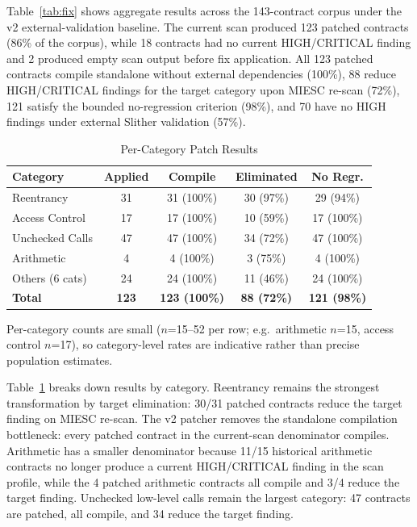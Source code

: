\documentclass[conference]{IEEEtran}
\begin{document}
Table~\ref{tab:fix} shows aggregate results across the 143-contract corpus under the v2 external-validation baseline. The current scan produced 123 patched contracts (86\% of the corpus), while 18 contracts had no current HIGH/CRITICAL finding and 2 produced empty scan output before fix application. All 123 patched contracts compile standalone without external dependencies (100\%), 88 reduce HIGH/CRITICAL findings for the target category upon MIESC re-scan (72\%), 121 satisfy the bounded no-regression criterion (98\%), and 70 have no HIGH findings under external Slither validation (57\%).

\begin{table}[htbp]
\caption{Per-Category Patch Results}
\label{tab:fix-category}
\centering
\begin{tabular}{@{}lcccc@{}}
\toprule
\textbf{Category} & \textbf{Applied} & \textbf{Compile} & \textbf{Eliminated} & \textbf{No Regr.} \\
\midrule
Reentrancy & 31 & 31 (100\%) & 30 (97\%) & 29 (94\%) \\
Access Control & 17 & 17 (100\%) & 10 (59\%) & 17 (100\%) \\
Unchecked Calls & 47 & 47 (100\%) & 34 (72\%) & 47 (100\%) \\
Arithmetic & 4 & 4 (100\%) & 3 (75\%) & 4 (100\%) \\
Others (6 cats) & 24 & 24 (100\%) & 11 (46\%) & 24 (100\%) \\
\midrule
\textbf{Total} & \textbf{123} & \textbf{123 (100\%)} & \textbf{88 (72\%)} & \textbf{121 (98\%)} \\
\bottomrule
\end{tabular}

\vspace{2pt}
\footnotesize{Per-category counts are small ($n$=15--52 per row; e.g.\ arithmetic $n$=15, access control $n$=17), so category-level rates are indicative rather than precise population estimates.}
\end{table}

Table~\ref{tab:fix-category} breaks down results by category. Reentrancy remains the strongest transformation by target elimination: 30/31 patched contracts reduce the target finding on MIESC re-scan. The v2 patcher removes the standalone compilation bottleneck: every patched contract in the current-scan denominator compiles. Arithmetic has a smaller denominator because 11/15 historical arithmetic contracts no longer produce a current HIGH/CRITICAL finding in the scan profile, while the 4 patched arithmetic contracts all compile and 3/4 reduce the target finding. Unchecked low-level calls remain the largest category: 47 contracts are patched, all compile, and 34 reduce the target finding.
\end{document}
